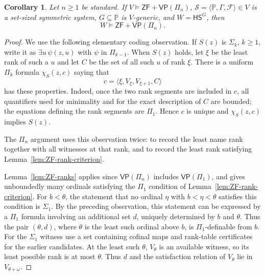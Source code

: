 \documentclass[11pt,a4paper]{amsart}
\newcommand{\VP}{\mathsf{VP}}
\newcommand{\ZF}{\mathsf{ZF}}
\newcommand{\HS}{\mathsf{HS}}
\theoremstyle{plain}
\newtheorem{corollary}[theorem]{Corollary}
\theoremstyle{definition}
\theoremstyle{remark}
\begin{document}
\begingroup

\begin{corollary}\label{cor:Pi-preservation}
Let $n\geq1$ be standard.  If $V\models\ZF+\VP(\Pi_n)$, $\mathscr S=\langle\mathbb P,\Gamma,\mathcal F\rangle\in V$ is a set-sized symmetric system, $G\subseteq\mathbb P$ is $V$-generic, and $W=\HS^G$, then
\[
W\models\ZF+\VP(\Pi_n).
\]
\end{corollary}

\begin{proof}
{\color{auditgreen}{For each fixed standard formula of positive L\'evy level $k\geq1$, symmetric forcing has a definition of the same polarity and level.  The bounded base is $\Delta_1$: existence and uniqueness of the name and forcing recursion tables give its two presentations.  At an existential step, the density clause quantifies over an HS name; condition quantifiers are bounded by $\mathbb P$.  Collection supplies the recursion certificates without selecting one name per condition, and negation gives the dual presentation.}}

We use the following elementary coding observation.  If $S(z)$ is $\Sigma_k$, $k\geq1$, write it as $\exists u\,\psi(z,u)$ with $\psi$ in $\Pi_{k-1}$.  When $S(z)$ holds, let $\xi$ be the least rank of such a $u$ and let $C$ be the set of all such $u$ of rank $\xi$.  There is a uniform $\Pi_k$ formula $\chi_S(z,c)$ saying that
\[
c=\langle\xi,V_\xi,V_{\xi+1},C\rangle
\]
has these properties.  Indeed, once the two rank segments are included in $c$, all quantifiers used for minimality and for the exact description of $C$ are bounded; the equations defining the rank segments are $\Pi_1$.  Hence $c$ is unique and $\chi_S(z,c)$ implies $S(z)$.

The $\Pi_n$ argument uses this observation twice: to record the least name rank together with all witnesses at that rank, and to record the least rank satisfying Lemma~\ref{lem:ZF-rank-criterion}.

{{\color{auditgreen}Lemma~\ref{lem:ZF-ranks} applies since $\VP(\Pi_n)$ includes $\VP(\Pi_1)$, and gives unboundedly many ordinals satisfying the $\Pi_1$ condition} of Lemma~\ref{lem:ZF-rank-criterion}.  For $b<\theta$, the statement that no ordinal $\eta$ with $b<\eta<\theta$ satisfies this condition is $\Sigma_1$.  By the preceding observation, this statement can be expressed by a $\Pi_1$ formula involving an additional set $d$, uniquely determined by $b$ and $\theta$.  Thus the pair $(\theta,d)$, where $\theta$ is the least such ordinal above $b$, is $\Pi_1$-definable from $b$.}  {\color{auditgreen}For the $\Sigma_1$ witness use a set containing cofinal maps and rank-table certificates for the earlier candidates.  At the least such $\theta$, $V_\theta$ is an available witness, so its least possible rank is at most $\theta$.  Thus $d$ and the satisfaction relation of $V_\theta$ lie in $V_{\theta+\omega}$.}


\end{proof}
\end{document}
